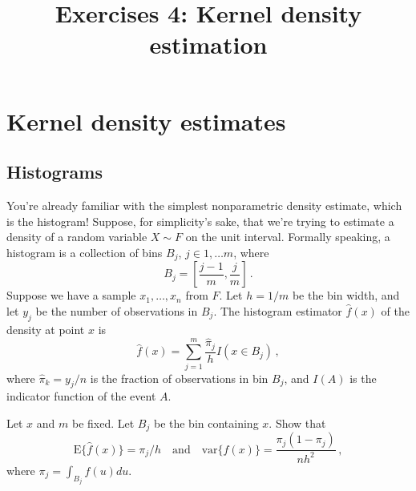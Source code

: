 \documentclass{mynotes}
\title[Exercises 4 $\cdot$ SSC 383D]{Exercises 4: Kernel density estimation}
\date{}  %
\newcommand{\E}{\mbox{E}}
\newcommand{\var}{\mbox{var}}
\begin{document}
\maketitle%

\section{Kernel density estimates}

\subsection{Histograms}

You're already familiar with the simplest nonparametric density estimate, which is the histogram!  Suppose, for simplicity's sake, that we're trying to estimate a density of a random variable $X \sim F$ on the unit interval.  Formally speaking, a histogram is a collection of bins $B_j$, $j \in 1, \ldots m$, where
$$
B_j = \left[\frac{j-1}{m}, \frac{j}{m} \right] \, .
$$
Suppose we have a sample $x_1, \ldots, x_n$ from $F$.  Let $h = 1/m$ be the bin width, and let $y_j$ be the number of observations in $B_j$.  The histogram estimator $\hat{f}(x)$ of the density at point $x$ is
$$
\hat{f}(x) = \sum_{j=1}^{m} \frac{\hat{\pi}_j}{h} I(x \in B_j) \, ,
$$
where $\hat{\pi}_k = y_j/n$ is the fraction of observations in bin $B_j$, and $I(A)$ is the indicator function of the event $A$.

Let $x$ and $m$ be fixed. Let $B_j$ be the bin containing $x$.  Show that
$$
\E \{ \hat{f}(x) \} = \pi_j/h \quad \mbox{and} \quad \var\{ \hat{f}(x)\} = \frac{\pi_j (1-\pi_j)}{nh^2} \, ,
$$
where $\pi_j = \int_{B_j} f(u) du$.
\end{document}
